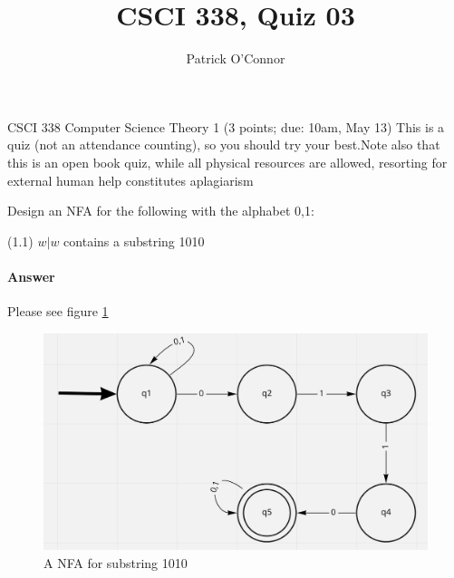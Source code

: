 \documentclass{article}
\title{CSCI 338, Quiz 03}
\author{Patrick O'Connor}
\begin{document}
\maketitle

CSCI 338 Computer Science Theory
1 (3 points; due: 10am, May 13)
This is a quiz (not an attendance counting), so you should 
try your best.Note also that this is an open book quiz, 
while all physical resources are allowed, resorting for external human 
help constitutes aplagiarism


Design an NFA for the following with the alphabet {0,1}:


(1.1) {$w|w$ contains a substring 1010}
\paragraph{Answer}
Please see figure \ref{fig:num01}
\begin{figure}
    \includegraphics[width=\linewidth]{01-1NFA.png}
    \caption{A NFA for substring 1010}
    \label{fig:num01}
\end{figure}
\end{document}
